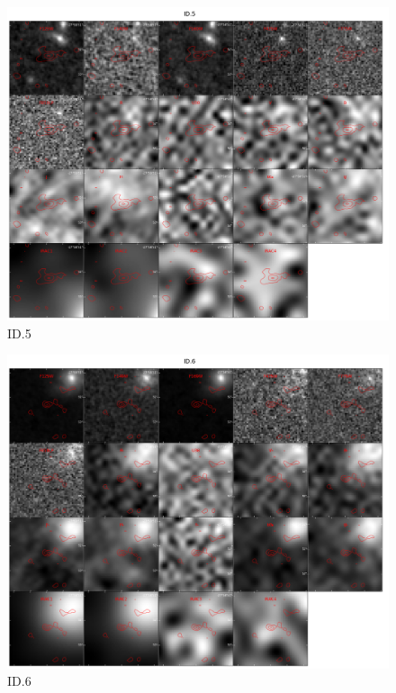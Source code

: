 \begin{figure}[tbp]
\centering \includegraphics[width=160mm]{Matched/ASPECS_Cutout_4.jpg}
\caption{ID.5}
\label{fig:Match_Four}
\end{figure}

\begin{figure}[tbp]
\centering \includegraphics[width=160mm]{Matched/ASPECS_Cutout_5.jpg}
\caption{ID.6}
\label{fig:Match_Five}
\end{figure}

